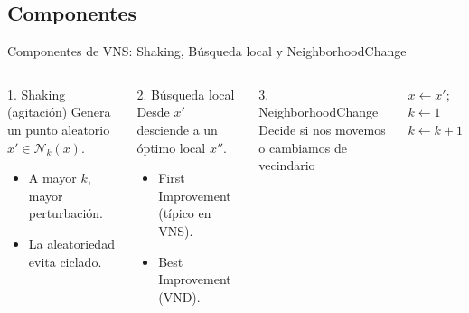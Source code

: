 \documentclass[aspectratio=169, 11pt, xcolor={dvipsnames,table}]{beamer}
\newcommand{\azul}[1]{\textcolor{UsachAzul}{#1}}
\begin{document}


\subsection{Componentes}

\begin{frame}{Componentes de VNS: Shaking, Búsqueda local y NeighborhoodChange}
\begin{columns}[T]
\begin{block}{1. Shaking (agitación)}
Genera un punto aleatorio $x' \in \mathcal{N}_k(x)$.
\begin{itemize}
  \item A mayor $k$, mayor perturbación.
  \item La aleatoriedad \azul{evita ciclado}.
\end{itemize}
\end{block}

\vspace{2pt}
\begin{block}{2. Búsqueda local}
Desde $x'$ desciende a un óptimo local $x''$.
\begin{itemize}
  \item First Improvement (típico en VNS).
  \item Best Improvement (VND).
\end{itemize}
\end{block}

\begin{alertblock}{3. NeighborhoodChange}
Decide si nos movemos o cambiamos de vecindario
\end{alertblock}

\vspace{2pt}
\footnotesize
\begin{algorithm}[H]
\begin{algorithmic}[1]
    \State $x \gets x'$; $k \gets 1$ 
  \Else
    \State $k \gets k + 1$ 
  \EndIf
\EndFunction
\end{algorithmic}
\end{algorithm}


\end{columns}
\end{frame}


\end{document}
